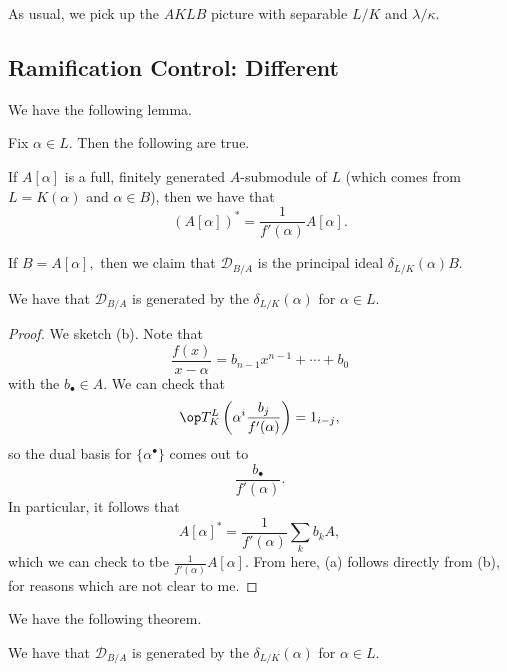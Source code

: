 \documentclass[../notes.tex]{subfiles}
\begin{document}


















As usual, we pick up the $AKLB$ picture with separable $L/K$ and $\lambda/\kappa.$

\subsection{Ramification Control: Different}
We have the following lemma.
\begin{lemma}
	Fix $\alpha\in L.$ Then the following are true.
	\begin{listalph}
		\item If $A[\alpha]$ is a full, finitely generated $A$-submodule of $L$ (which comes from $L=K(\alpha)$ and $\alpha\in B$), then we have that
		\[(A[\alpha])^*=\frac1{f'(\alpha)}A[\alpha].\]
		\item If $B=A[\alpha],$ then we claim that $\mathcal D_{B/A}$ is the principal ideal $\delta_{L/K}(\alpha)B.$
	\end{listalph}
	We have that $\mathcal D_{B/A}$ is generated by the $\delta_{L/K}(\alpha)$ for $\alpha\in L.$
\end{lemma}
\begin{proof}
	We sketch (b). Note that
	\[\frac{f(x)}{x-\alpha}=b_{n-1}x^{n-1}+\cdots+b_0\]
	with the $b_\bullet\in A.$ We can check that
	\[\op T^L_K\left(\alpha^i\frac{b_j}{f'(\alpha)}\right)=1_{i-j},\]
	so the dual basis for $\{\alpha^\bullet\}$ comes out to
	\[\frac{b_\bullet}{f'(\alpha)}.\]
	In particular, it follows that
	\[A[\alpha]^*=\frac1{f'(\alpha)}\sum_kb_kA,\]
	which we can check to tbe $\frac1{f'(\alpha)}A[\alpha].$ From here, (a) follows directly from (b), for reasons which are not clear to me.
\end{proof}
We have the following theorem.
\begin{theorem}
	We have that $\mathcal D_{B/A}$ is generated by the $\delta_{L/K}(\alpha)$ for $\alpha\in L.$
\end{theorem}
\end{document}
